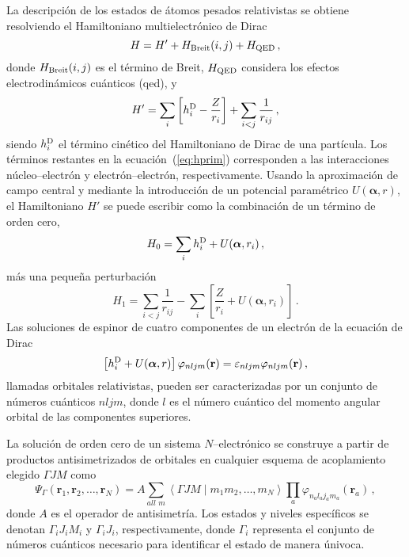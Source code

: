 La descripción de los estados de átomos pesados relativistas se 
obtiene resolviendo el Hamiltoniano multielectrónico de Dirac 
\begin{equation}
 H = H' + H_{\mathrm{\mbox{\scriptsize Breit}}}(i,j) +
 H_{\mbox{\scriptsize QED}}\,,
\label{eq:htot}
\end{equation}
donde $H_{\mathrm{\mbox{\scriptsize Breit}}}(i,j)$ es el término de 
Breit, $H_{\mbox{\scriptsize QED}}$ considera los efectos 
electrodinámicos cuánticos (\acs{qed}), y
\begin{equation}
 H' = \sum_i \left[ h_i^{\mbox{\scriptsize D}} - \frac{Z}{r_i}\right]
 + \sum_{i<j}\frac{1}{r_{ij}}\,,
\label{eq:hprim}
\end{equation}
siendo $h_i^{\mbox{\scriptsize D}}$ el término cinético del 
Hamiltoniano de Dirac de una partícula. Los términos restantes en la
ecuación~(\ref{eq:hprim}) corresponden a las interacciones 
núcleo--electrón y electrón--electrón, respectivamente. Usando la 
aproximación de campo central y mediante la introducción de un potencial 
paramétrico $U(\boldsymbol{\alpha},r)$, el Hamiltoniano $H'$ se puede escribir como la 
combinación de un término de orden cero, 
\begin{equation}
 H_0 = \sum_i h_i^{\mbox{\scriptsize D}} + U(\boldsymbol{\alpha},r_i)\,,
\end{equation}
más una pequeña perturbación
\begin{equation}
 H_1 = \sum_{i<j}\frac{1}{r_{ij}}
 - \sum_i \left[ \frac{Z}{r_i} + U(\boldsymbol{\alpha},r_i) \right]\,.
\end{equation}
Las soluciones de espinor de cuatro componentes de un electrón de la 
ecuación de Dirac
\begin{equation}
\left[ h_i^{\mbox{\scriptsize D}} +U(\boldsymbol{\alpha},r) \right] \varphi_{nljm}(\mathbf{r}) 
= \varepsilon_{nljm} \varphi_{nljm}(\mathbf{r})\,,
\label{eq:ecuacionDirac}
\end{equation}
llamadas orbitales relativistas, pueden ser caracterizadas por un 
conjunto de números cuánticos $nljm$, donde $l$ es el número cuántico 
del momento angular orbital de las componentes superiores. 

La solución de orden cero de un sistema $N$--electrónico se construye a 
partir de productos antisimetrizados de orbitales en cualquier esquema 
de acoplamiento elegido $\Gamma JM$ como 
\begin{equation}
\Psi_{\Gamma}\left(\mathbf{r}_1, \mathbf{r}_2, \ldots, \mathbf{r}_N\right)=A \sum_{all\,\,m}\left\langle\Gamma J M \mid m_1 m_2, \ldots, m_{N}\right\rangle \prod_{a} \varphi_{n_a l_a j_a m_a}\left(\mathbf{r}_a\right)\,,
\end{equation}
donde $A$ es el operador de antisimetría. Los estados y niveles 
específicos se denotan $\Gamma_iJ_iM_i$ y $\Gamma_iJ_i$, respectivamente,
donde $\Gamma_i$ representa el conjunto de números cuánticos necesario 
para identificar el estado de manera únivoca. 

